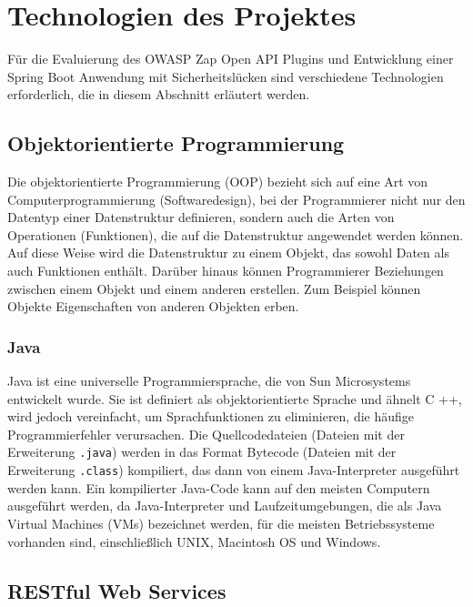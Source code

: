 \section{Technologien des Projektes}

Für die Evaluierung des OWASP Zap Open API Plugins und Entwicklung einer Spring Boot Anwendung mit Sicherheitslücken sind verschiedene Technologien erforderlich, die in diesem Abschnitt erläutert werden.

\subsection{Objektorientierte Programmierung}

Die objektorientierte Programmierung (OOP) bezieht sich auf eine Art von Computerprogrammierung (Softwaredesign), bei der Programmierer nicht nur den Datentyp einer Datenstruktur definieren, sondern auch die Arten von Operationen (Funktionen), die auf die Datenstruktur angewendet werden können. Auf diese Weise wird die Datenstruktur zu einem Objekt, das sowohl Daten als auch Funktionen enthält. Darüber hinaus können Programmierer Beziehungen zwischen einem Objekt und einem anderen erstellen. Zum Beispiel können Objekte Eigenschaften von anderen Objekten erben\cite{oop15beal}.

\subsubsection{Java}

Java ist eine universelle Programmiersprache, die von Sun Microsystems entwickelt wurde. Sie ist definiert als objektorientierte Sprache und ähnelt C ++, wird jedoch vereinfacht, um Sprachfunktionen zu eliminieren, die häufige Programmierfehler verursachen. Die Quellcodedateien (Dateien mit der Erweiterung \texttt{.java}) werden in das Format Bytecode (Dateien mit der Erweiterung \texttt{.class}) kompiliert, das dann von einem Java-Interpreter ausgeführt werden kann. Ein kompilierter Java-Code kann auf den meisten Computern ausgeführt werden, da Java-Interpreter und Laufzeitumgebungen, die als Java Virtual Machines (VMs) bezeichnet werden, für die meisten Betriebssysteme vorhanden sind, einschließlich UNIX, Macintosh OS und Windows\cite{java18beal}.

\subsection{RESTful Web Services}


